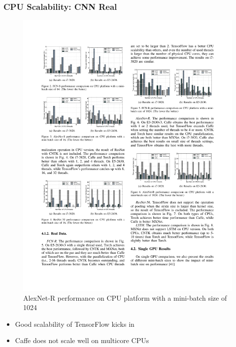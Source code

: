 \begin{frame}
	\MyLogo
	\frametitle{CPU Scalability: CNN Real}  
	\begin{figure}[htbp] 
		\includegraphics[width=\linewidth]{figures/AlexNet-R1.pdf} 
		\caption{AlexNet-R performance on CPU platform with a mini-batch size of 1024}
	\end{figure}
	
\vskip -10pt
\begin{mdframed}[style=mystyle1]
\begin{itemize}
\item Good scalability of TensorFlow kicks in 
\item Caffe does not scale well on multicore CPUs
\end{itemize}
\end{mdframed}

\end{frame}


